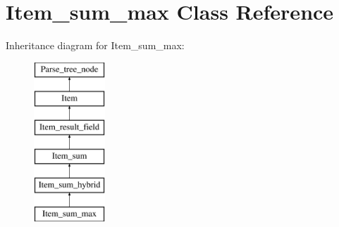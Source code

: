 \hypertarget{classItem__sum__max}{}\section{Item\+\_\+sum\+\_\+max Class Reference}
\label{classItem__sum__max}
Inheritance diagram for Item\+\_\+sum\+\_\+max\+:\begin{figure}[H]
\begin{center}
\leavevmode
\includegraphics[height=6.000000cm]{classItem__sum__max}
\end{center}
\end{figure}
